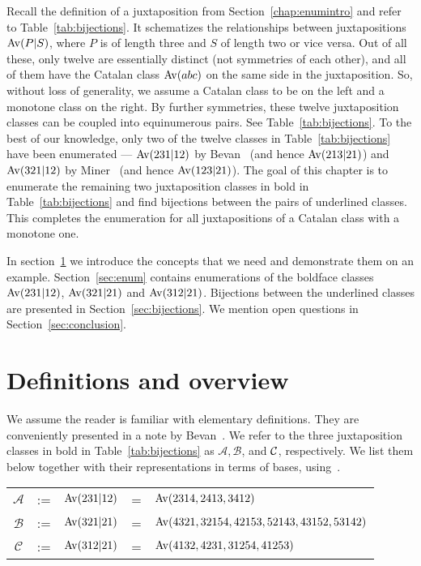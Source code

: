 \documentclass[12pt, a4paper, twoside]{report}
\begin{document}
Recall the definition of a juxtaposition from Section~\ref{chap:enumintro} and refer to Table~\ref{tab:bijections}. It schematizes the relationships between juxtapositions $\mathrm{Av}(P|S)$, where $P$ is of length three and $S$ of length two or vice versa. Out of all these, only twelve are essentially distinct (not symmetries of each other), and all of them have the Catalan class $\mathrm{Av}(abc)$ on the same side in the juxtaposition. So, without loss of generality, we assume a Catalan class to be on the left and a monotone class on the right. By further symmetries, these twelve juxtaposition classes can be coupled into equinumerous pairs. See Table~\ref{tab:bijections}. To the best of our knowledge, only two of the twelve classes in Table~\ref{tab:bijections} have been enumerated --- $\mathrm{Av}(231|12)$ by Bevan~\cite{bevan-new} (and hence $\mathrm{Av}(213|21)$) and $\mathrm{Av}(321|12)$ by Miner~\cite{miner16twobyfour} (and hence $\mathrm{Av}(123|21)$). The goal of this chapter is to enumerate the remaining two juxtaposition classes in bold in Table~\ref{tab:bijections} and find bijections between the pairs of underlined classes. This completes the enumeration for all juxtapositions of a Catalan class with a monotone one.

In section~\ref{sec:catalanjuxt_defs} we introduce the concepts that we need and demonstrate them on an example. Section~\ref{sec:enum} contains enumerations of the boldface classes $\mathrm{Av}(231|12)$, $\mathrm{Av}(321|21)$ and $\mathrm{Av}(312|21)$.  Bijections between the underlined classes are presented in Section~\ref{sec:bijections}. We mention open questions in Section~\ref{sec:conclusion}.

\section{Definitions and overview}
\label{sec:catalanjuxt_defs}
We assume the reader is familiar with elementary definitions. They are conveniently presented in a note by Bevan~\cite{bevan2015defs}.  We refer to the three juxtaposition classes in bold in Table~\ref{tab:bijections} as $\mathcal{A}, \mathcal{B}$, and $\mathcal{C}$, respectively. We list them below together with their representations in terms of bases, using~\cite{atkinson1997restricted}.

\begin{center}
\begin{tabular}{c c c c l}
$\mathcal{A}$&:= & $\mathrm{Av}(231|12)$ & = & $\mathrm{Av}(2314, 2413, 3412)$ \\
$\mathcal{B}$&:= & $\mathrm{Av}(321|21)$ & = & $\mathrm{Av}(4321, 32154, 42153, 52143, 43152, 53142)$ \\
$\mathcal{C}$&:= & $\mathrm{Av}(312|21)$ & = & $\mathrm{Av}(4132, 4231, 31254, 41253)$\\  %
\end{tabular}
\end{center}
\end{document}
